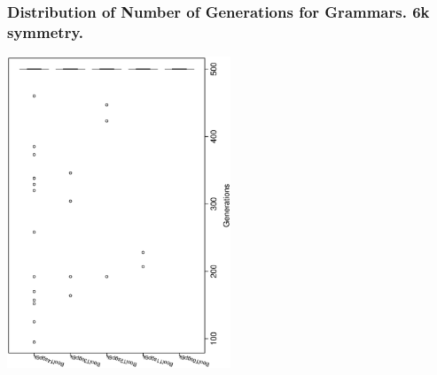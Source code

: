  \begin{frame}
 \frametitle{ Distribution of Number of Generations for Grammars. 6k  symmetry. }
 \begin{center}
\includegraphics[width=0.5\textwidth, angle=-90]
{ExpBboxplottGenerations004.eps}
 \end{center}
 \label{ExpBboxplottGenerations004.eps}  
 \end{frame}

